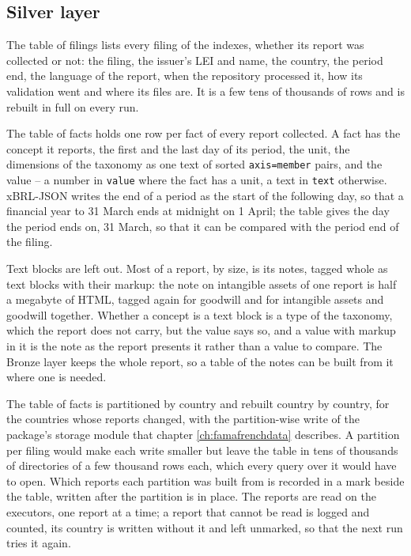 \subsection{Silver layer}

The table of filings lists every filing of the indexes, whether its report was collected or not: the filing, the issuer's LEI and name, the country, the period end, the language of the report, when the repository processed it, how its validation went and where its files are. It is a few tens of thousands of rows and is rebuilt in full on every run.

The table of facts holds one row per fact of every report collected. A fact has the concept it reports, the first and the last day of its period, the unit, the dimensions of the taxonomy as one text of sorted \verb|axis=member| pairs, and the value -- a number in \verb|value| where the fact has a unit, a text in \verb|text| otherwise. xBRL-JSON writes the end of a period as the start of the following day, so that a financial year to 31 March ends at midnight on 1 April; the table gives the day the period ends on, 31 March, so that it can be compared with the period end of the filing.

Text blocks are left out. Most of a report, by size, is its notes, tagged whole as text blocks with their markup: the note on intangible assets of one report is half a megabyte of HTML, tagged again for goodwill and for intangible assets and goodwill together. Whether a concept is a text block is a type of the taxonomy, which the report does not carry, but the value says so, and a value with markup in it is the note as the report presents it rather than a value to compare. The Bronze layer keeps the whole report, so a table of the notes can be built from it where one is needed.

The table of facts is partitioned by country and rebuilt country by country, for the countries whose reports changed, with the partition-wise write of the package's storage module that chapter \ref{ch:famafrenchdata} describes. A partition per filing would make each write smaller but leave the table in tens of thousands of directories of a few thousand rows each, which every query over it would have to open. Which reports each partition was built from is recorded in a mark beside the table, written after the partition is in place. The reports are read on the executors, one report at a time; a report that cannot be read is logged and counted, its country is written without it and left unmarked, so that the next run tries it again.

